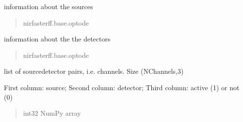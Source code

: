 \documentclass[letterpaper,10pt,english]{sphinxmanual}
\begin{document}
\begin{fulllineitems}
\begin{fulllineitems}
\label{\detokenize{_autosummary/nirfasterff.base.fluor_mesh.fluormesh:nirfasterff.base.fluor_mesh.fluormesh.source}}
\pysigstartsignatures
\pysigline
{}
\pysigstopsignatures
\sphinxAtStartPar
information about the sources
\begin{quote}\begin{description}
\sphinxAtStartPar
nirfasterff.base.optode

\end{description}\end{quote}

\end{fulllineitems}


\begin{fulllineitems}
\label{\detokenize{_autosummary/nirfasterff.base.fluor_mesh.fluormesh:nirfasterff.base.fluor_mesh.fluormesh.meas}}
\pysigstartsignatures
\pysigline
{}
\pysigstopsignatures
\sphinxAtStartPar
information about the the detectors
\begin{quote}\begin{description}
\sphinxAtStartPar
nirfasterff.base.optode

\end{description}\end{quote}

\end{fulllineitems}


\begin{fulllineitems}
\label{\detokenize{_autosummary/nirfasterff.base.fluor_mesh.fluormesh:nirfasterff.base.fluor_mesh.fluormesh.link}}
\pysigstartsignatures
\pysigline
{}
\pysigstopsignatures
\sphinxAtStartPar
list of source\sphinxhyphen{}detector pairs, i.e. channels. Size (NChannels,3)

\sphinxAtStartPar
First column: source; Second column: detector; Third column: active (1) or not (0)
\begin{quote}\begin{description}
\sphinxAtStartPar
int32 NumPy array


\end{description}
\end{quote}
\end{fulllineitems}
\end{fulllineitems}
\end{document}
